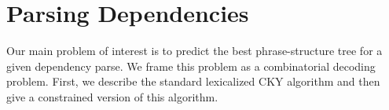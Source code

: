 \documentclass[11pt,letterpaper]{article}
\begin{document}























\section{Parsing Dependencies}

Our main problem of interest is to predict the best
phrase-structure tree for a given dependency parse.
We frame this problem as a combinatorial decoding problem.
First, we describe the standard lexicalized CKY algorithm
and then give a constrained version of this algorithm.
\end{document}
